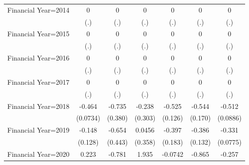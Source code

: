 \begin{table}[htbp]
\begin{tabular}{l*{6}{c}}
\addlinespace
Financial Year=2014 &           0         &           0         &           0         &           0         &           0         &           0         \\
                    &         (.)         &         (.)         &         (.)         &         (.)         &         (.)         &         (.)         \\
\addlinespace
Financial Year=2015 &           0         &           0         &           0         &           0         &           0         &           0         \\
                    &         (.)         &         (.)         &         (.)         &         (.)         &         (.)         &         (.)         \\
\addlinespace
Financial Year=2016 &           0         &           0         &           0         &           0         &           0         &           0         \\
                    &         (.)         &         (.)         &         (.)         &         (.)         &         (.)         &         (.)         \\
\addlinespace
Financial Year=2017 &           0         &           0         &           0         &           0         &           0         &           0         \\
                    &         (.)         &         (.)         &         (.)         &         (.)         &         (.)         &         (.)         \\
\addlinespace
Financial Year=2018 &      -0.464\sym{***}&      -0.735\sym{*}  &      -0.238         &      -0.525\sym{***}&      -0.544\sym{***}&      -0.512\sym{***}\\
                    &    (0.0734)         &     (0.380)         &     (0.303)         &     (0.126)         &     (0.170)         &    (0.0886)         \\
\addlinespace
Financial Year=2019 &      -0.148         &      -0.654         &      0.0456         &      -0.397\sym{**} &      -0.386\sym{***}&      -0.331\sym{***}\\
                    &     (0.128)         &     (0.443)         &     (0.358)         &     (0.183)         &     (0.132)         &    (0.0775)         \\
\addlinespace
Financial Year=2020 &       0.223         &      -0.781         &       1.935         &     -0.0742         &      -0.865         &      -0.257         \\

\end{tabular}
\end{table}
